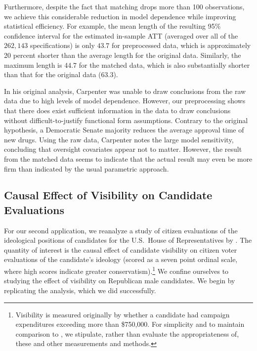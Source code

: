 \documentclass[11pt,titlepage]{article}
\begin{document}
Furthermore, despite the fact that matching drops more than 100
observations, we achieve this considerable reduction in model
dependence while improving statistical efficiency. For example, the
mean length of the resulting 95\% confidence interval for the estimated
in-sample ATT (averaged over all of the $262,143$ specifications) is
only $43.7$ for preprocessed data, which is approximately 20 percent
shorter than the average length for the original data. Similarly, the
maximum length is 44.7 for the matched data, which is also
substantially shorter than that for the original data (63.3).

In his original analysis, Carpenter was unable to draw conclusions
from the raw data due to high levels of model dependence.  However,
our preprocessing shows that there does exist sufficient information
in the data to draw conclusions without difficult-to-justify
functional form assumptions.  Contrary to the original hypothesis, a
Democratic Senate majority reduces the average approval time of new
drugs.  Using the raw data, Carpenter notes the large model
sensitivity, concluding that oversight covariates appear not to
matter.  However, the result from the matched data seems to indicate
that the actual result may even be more firm than indicated by the
usual parametric approach.

\subsection{Causal Effect of Visibility on Candidate
  Evaluations}

For our second application, we reanalyze a study of citizen
evaluations of the ideological positions of candidates for the U.S.\ 
House of Representatives by \citet{Koch02}.  The quantity of interest
is the causal effect of candidate visibility on citizen voter
evaluations of the candidate's ideology (scored as a seven point
ordinal scale, where high scores indicate greater
conservatism).\footnote{Visibility is measured originally by whether a
  candidate had campaign expenditures exceeding more than \$750,000.
  For simplicity and to maintain comparison to \citet{Koch02}, we
  stipulate, rather than evaluate the appropriateness of, these and
  other measurements and methods.}  We confine ourselves to studying
the effect of visibility on Republican male candidates.  We begin by
replicating the analysis, which we did successfully.
\end{document}
